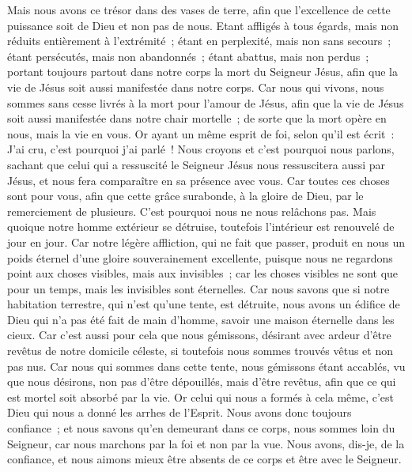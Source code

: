\begin{multicols}{2}
Mais nous avons ce trésor dans des vases de terre, afin que l'excellence de cette puissance soit de Dieu et non pas de nous.
Etant affligés à tous égards, mais non réduits entièrement à l'extrémité~; étant en perplexité, mais non sans secours~;
étant persécutés, mais non abandonnés~; étant abattus, mais non perdus~;
portant toujours partout dans notre corps la mort du Seigneur Jésus, afin que la vie de Jésus soit aussi manifestée dans notre corps.
Car nous qui vivons, nous sommes sans cesse livrés à la mort pour l'amour de Jésus, afin que la vie de Jésus soit aussi manifestée dans notre chair mortelle~;
de sorte que la mort opère en nous, mais la vie en vous.
Or ayant un même esprit de foi, selon qu'il est écrit~: J'ai cru, c'est pourquoi j'ai parlé~! Nous croyons et c'est pourquoi nous parlons,
sachant que celui qui a ressuscité le Seigneur Jésus nous ressuscitera aussi par Jésus, et nous fera comparaître en sa présence avec vous.
Car toutes ces choses sont pour vous, afin que cette grâce surabonde, à la gloire de Dieu, par le remerciement de plusieurs.
C'est pourquoi nous ne nous relâchons pas. Mais quoique notre homme extérieur se détruise, toutefois l'intérieur est renouvelé de jour en jour.
Car notre légère affliction, qui ne fait que passer, produit en nous un poids éternel d'une gloire souverainement excellente,
puisque nous ne regardons point aux choses visibles, mais aux invisibles~; car les choses visibles ne sont que pour un temps, mais les invisibles sont éternelles.
\VerseOne{}Car nous savons que si notre habitation terrestre, qui n'est qu'une tente, est détruite, nous avons un édifice de Dieu qui n'a pas été fait de main d'homme, savoir une maison éternelle dans les cieux.
Car c'est aussi pour cela que nous gémissons, désirant avec ardeur d'être revêtus de notre domicile céleste,
si toutefois nous sommes trouvés vêtus et non pas nus.
Car nous qui sommes dans cette tente, nous gémissons étant accablés, vu que nous désirons, non pas d'être dépouillés, mais d'être revêtus, afin que ce qui est mortel soit absorbé par la vie.
Or celui qui nous a formés à cela même, c'est Dieu qui nous a donné les arrhes de l'Esprit.
Nous avons donc toujours confiance~; et nous savons qu'en demeurant dans ce corps, nous sommes loin du Seigneur,
car nous marchons par la foi et non par la vue.
Nous avons, dis-je, de la confiance, et nous aimons mieux être absents de ce corps et être avec le Seigneur.

\end{multicols}

